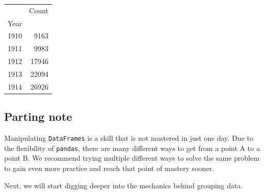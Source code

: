 \documentclass[
  letterpaper,
  DIV=11,
  numbers=noendperiod]{scrreprt}
\begin{document}
\begin{tabular}{lr}
\toprule
{} &  Count \\
Year &        \\
\midrule
1910 &   9163 \\
1911 &   9983 \\
1912 &  17946 \\
1913 &  22094 \\
1914 &  26926 \\
\bottomrule
\end{tabular}

\hypertarget{parting-note-1}{%
\subsection{Parting note}\label{parting-note-1}}

Manipulating \texttt{DataFrames} is a skill that is not mastered in just
one day. Due to the flexibility of \texttt{pandas}, there are many
different ways to get from a point A to a point B. We recommend trying
multiple different ways to solve the same problem to gain even more
practice and reach that point of mastery sooner.

Next, we will start digging deeper into the mechanics behind grouping
data.
\end{document}
